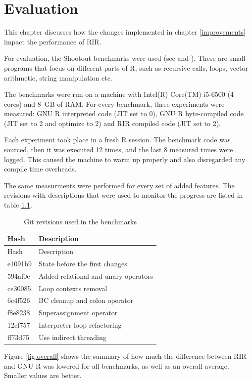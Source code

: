 \chapter{Evaluation\label{evaluation}}

This chapter discusses how the changes implemented in chapter \ref{improvements} impact the performance of RIR.

For evaluation, the Shootout benchmarks were used (see \autocite{shootout} and \autocite{fastr}). These are small programs that focus on different parts of R, such as recursive calls, loops, vector arithmetic, string manipulation etc.


The benchmarks were run on a machine with Intel(R) Core(TM) i5-6500 (4 cores) and 8~GB of RAM. For every benchmark, three experiments were measured: GNU R interpreted code (JIT set to 0), GNU R byte-compiled code (JIT set to 2 and optimize to 2) and RIR compiled code (JIT set to 2).

Each experiment took place in a fresh R session. The benchmark code was sourced, then it was executed 12 times, and the last 8 measured times were logged. This caused the machine to warm up properly and also disregarded any compile time overheads.

The same measurments were performed for every set of added features. The revisions with descriptions that were used to monitor the progress are listed in table \ref{tab:git-rev}.

\begin{longtable}[c]{@{}ll@{}}
\caption{Git revisions used in the benchmarks\label{tab:git-rev}} \tabularnewline
\toprule
Hash & Description \tabularnewline
\midrule
\endfirsthead
\toprule
Hash & Description \tabularnewline
\midrule
\endhead
e1091b9 & State before the first changes \tabularnewline
594af0c & Added relational and unary operators \tabularnewline
ce30085 & Loop contexts removal \tabularnewline
6c4f526 & BC cleanup and colon operator \tabularnewline
f8e8238 & Superassignment operator \tabularnewline
12ef757 & Interpreter loop refactoring \tabularnewline
ff73d75 & Use indirect threading \tabularnewline
\bottomrule
\end{longtable}

Figure \ref{fig:overall} shows the summary of how much the difference between RIR and GNU R was lowered for all benchmarks, as well as an overall average. Smaller values are better.

